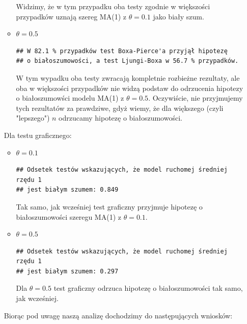 \documentclass[10pt, a4paper]{article}\usepackage[]{graphicx}\usepackage[]{xcolor}
\makeatletter
\newenvironment{kframe}{%
 \def\at@end@of@kframe{}%
 \ifinner\ifhmode%
  \def\at@end@of@kframe{\end{minipage}}%
  \begin{minipage}{\columnwidth}%
 \fi\fi%
 \def\FrameCommand##1{\hskip\@totalleftmargin \hskip-\fboxsep
 \colorbox{shadecolor}{##1}\hskip-\fboxsep
     \hskip-\linewidth \hskip-\@totalleftmargin \hskip\columnwidth}%
 \MakeFramed {\advance\hsize-\width
   \@totalleftmargin\z@ \linewidth\hsize
   \@setminipage}}%
 {\par\unskip\endMakeFramed%
 \at@end@of@kframe}
\newenvironment{knitrout}{}{} %
\makeatother
\begin{document}
\begin{enumerate}
\begin{itemize}
\begin{knitrout}
\end{knitrout}
Widzimy, że w tym przypadku oba testy zgodnie w większości przypadków uznają szereg MA(1) z $\theta=0.1$ jako biały szum.
\item $\theta=0.5$
\begin{knitrout}
\color{fgcolor}\begin{kframe}
\begin{verbatim}
## W 82.1 % przypadków test Boxa-Pierce'a przyjął hipotezę 
## o białoszumowości, a test Ljungi-Boxa w 56.7 % przypadków.
\end{verbatim}
\end{kframe}
\end{knitrout}
W tym wypadku oba testy zwracają kompletnie rozbieżne rezultaty, ale oba w większości przypadków nie widzą podstaw do odrzucenia hipotezy o białoszumowści modelu MA(1) z $\theta=0.5$. Oczywiście, nie przyjmujemy tych rezultatów za prawdziwe, gdyż wiemy, że dla większego (czyli "lepszego") $n$ odrzucamy hipotezę o białoszumowości.
\end{itemize}
Dla testu graficznego:
\begin{itemize}
\item $\theta=0.1$
\begin{knitrout}
\color{fgcolor}\begin{kframe}
\begin{verbatim}
## Odsetek testów wskazujących, że model ruchomej średniej rzędu 1
## jest białym szumem: 0.849
\end{verbatim}
\end{kframe}
\end{knitrout}
Tak samo, jak wcześniej test graficzny przyjmuje hipotezę o białoszumowości szeregu MA(1) z $\theta=0.1$.
\item $\theta=0.5$
\begin{knitrout}
\color{fgcolor}\begin{kframe}
\begin{verbatim}
## Odsetek testów wskazujących, że model ruchomej średniej rzędu 1
## jest białym szumem: 0.297
\end{verbatim}
\end{kframe}
\end{knitrout}
Dla $\theta=0.5$ test graficzny odrzuca hipotezę o białoszumowości tak samo, jak wcześniej.
\end{itemize}
Biorąc pod uwagę naszą analizę dochodzimy do następujących wniosków:

\end{enumerate}
\end{document}
